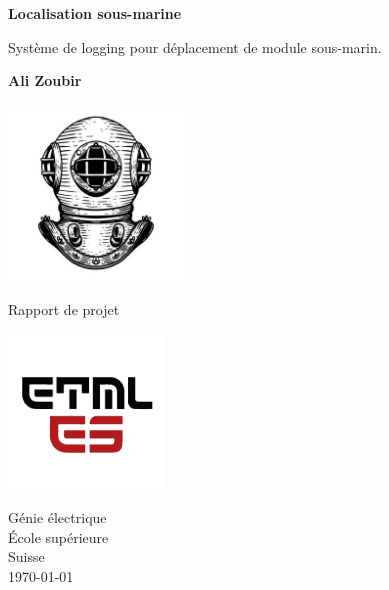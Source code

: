 \begin{titlepage}
   \begin{center}
        \vspace*{1cm}
        \LARGE
        {\Huge \textbf{Localisation sous-marine}}
        
        \vspace{0.3cm}
        Système de logging pour déplacement de module sous-marin.
            
        \vspace{1.5cm}

        \textbf{Ali Zoubir} \vspace{5mm}
        
        \includegraphics[width=0.35\textwidth]{../LOGO-PROJ.png}

        \vfill
            
        Rapport de projet
            
        \vspace{0.8cm}
     
        \includegraphics[width=0.31\textwidth]{../ETML-ES-LOGO.png}

        Génie électrique\\
        École supérieure\\
        Suisse\\
        \monthyeardate\today
            
   \end{center}
\end{titlepage}